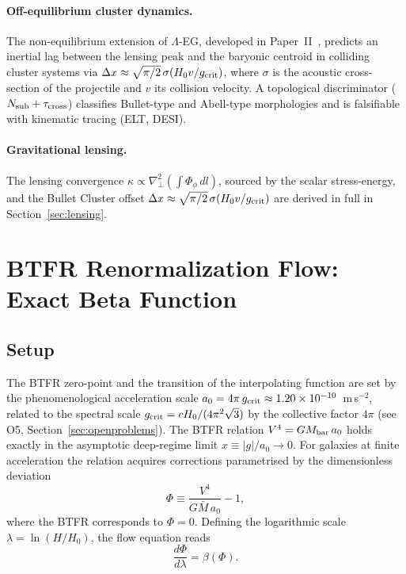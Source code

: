 \documentclass[11pt,a4paper]{article}
\begin{document}
\paragraph{Off-equilibrium cluster dynamics.}
The non-equilibrium extension of $\Lambda$-EG, developed in Paper~II~\cite{PaperII},
predicts an inertial lag between the lensing peak and the baryonic centroid in
colliding cluster systems via $\Delta x \approx \sqrt{\pi/2}\,\sigma(H_0 v/g_{\rm crit})$, where
$\sigma$ is the acoustic cross-section of the projectile and $v$ its collision velocity.
A topological discriminator ($N_{\rm sub} + \tau_{\rm cross}$) classifies Bullet-type
and Abell-type morphologies and is falsifiable with kinematic tracing (ELT, DESI).

\paragraph{Gravitational lensing.}
The lensing convergence $\kappa\propto\nabla_\perp^2(\int\Phi_\phi\,dl)$, sourced by the
scalar stress-energy, and the Bullet Cluster offset
$\Delta x\approx\sqrt{\pi/2}\,\sigma(H_0 v/g_{\rm crit})$ are derived in full in
Section~\ref{sec:lensing}.

\section{BTFR Renormalization Flow: Exact Beta Function}
\label{sec:betafunction}

\subsection{Setup}
The BTFR zero-point and the transition of the interpolating function are set by
the phenomenological acceleration scale $a_0 = 4\pi\,g_{\rm crit} \approx
1.20\times10^{-10}$~m\,s$^{-2}$, related to the spectral scale
$g_{\rm crit} = cH_0/(4\pi^2\sqrt{3})$ by the collective factor $4\pi$
(see O5, Section~\ref{sec:openproblems}).
The BTFR relation $V^4 = GM_{\rm bar}\,a_0$ holds exactly in the
asymptotic deep-regime limit $x\equiv|g|/a_0\to 0$.  For galaxies at
finite acceleration the relation acquires corrections parametrised by the
dimensionless deviation
\begin{equation}
  \Phi \equiv \frac{V^4}{G\bar{M}\,a_0} - 1,
\end{equation}
where the BTFR corresponds to $\Phi = 0$.  Defining the logarithmic scale
$\lambda = \ln(H/H_0)$, the flow equation reads
\begin{equation}
  \frac{d\Phi}{d\lambda} = \beta(\Phi).
\end{equation}
\end{document}
